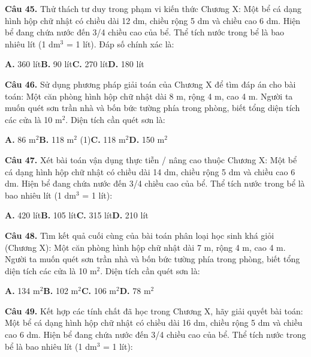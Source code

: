 \documentclass[11pt,a4paper]{article}
\begin{document}
\textbf{\color{primary} Câu 45.} Thử thách tư duy trong phạm vi kiến thức Chương X: Một bể cá dạng hình hộp chữ nhật có chiều dài 12 dm, chiều rộng 5 dm và chiều cao 6 dm. Hiện bể đang chứa nước đến 3/4 chiều cao của bể. Thể tích nước trong bể là bao nhiêu lít (1 dm$^3$ = 1 lít). Đáp số chính xác là:\par
\hspace*{1.5em}\textbf{A.} 360 lít\quad\quad \textbf{B.} 90 lít\quad\quad \textbf{C.} 270 lít\quad\quad \textbf{D.} 180 lít\par\vspace{2pt}
\textbf{\color{primary} Câu 46.} Sử dụng phương pháp giải toán của Chương X để tìm đáp án cho bài toán: Một căn phòng hình hộp chữ nhật dài 8 m, rộng 4 m, cao 4 m. Người ta muốn quét sơn trần nhà và bốn bức tường phía trong phòng, biết tổng diện tích các cửa là 10 m$^2$. Diện tích cần quét sơn là:\par
\hspace*{1.5em}\textbf{A.} 86 m$^2$\quad\quad \textbf{B.} 118 m$^2$ (1)\quad\quad \textbf{C.} 118 m$^2$\quad\quad \textbf{D.} 150 m$^2$\par\vspace{2pt}
\textbf{\color{primary} Câu 47.} Xét bài toán vận dụng thực tiễn / nâng cao thuộc Chương X: Một bể cá dạng hình hộp chữ nhật có chiều dài 14 dm, chiều rộng 5 dm và chiều cao 6 dm. Hiện bể đang chứa nước đến 3/4 chiều cao của bể. Thể tích nước trong bể là bao nhiêu lít (1 dm$^3$ = 1 lít):\par
\hspace*{1.5em}\textbf{A.} 420 lít\quad\quad \textbf{B.} 105 lít\quad\quad \textbf{C.} 315 lít\quad\quad \textbf{D.} 210 lít\par\vspace{2pt}
\textbf{\color{primary} Câu 48.} Tìm kết quả cuối cùng của bài toán phân loại học sinh khá giỏi (Chương X): Một căn phòng hình hộp chữ nhật dài 7 m, rộng 4 m, cao 4 m. Người ta muốn quét sơn trần nhà và bốn bức tường phía trong phòng, biết tổng diện tích các cửa là 10 m$^2$. Diện tích cần quét sơn là:\par
\hspace*{1.5em}\textbf{A.} 134 m$^2$\quad\quad \textbf{B.} 102 m$^2$\quad\quad \textbf{C.} 106 m$^2$\quad\quad \textbf{D.} 78 m$^2$\par\vspace{2pt}
\textbf{\color{primary} Câu 49.} Kết hợp các tính chất đã học trong Chương X, hãy giải quyết bài toán: Một bể cá dạng hình hộp chữ nhật có chiều dài 16 dm, chiều rộng 5 dm và chiều cao 6 dm. Hiện bể đang chứa nước đến 3/4 chiều cao của bể. Thể tích nước trong bể là bao nhiêu lít (1 dm$^3$ = 1 lít):\par
\end{document}
